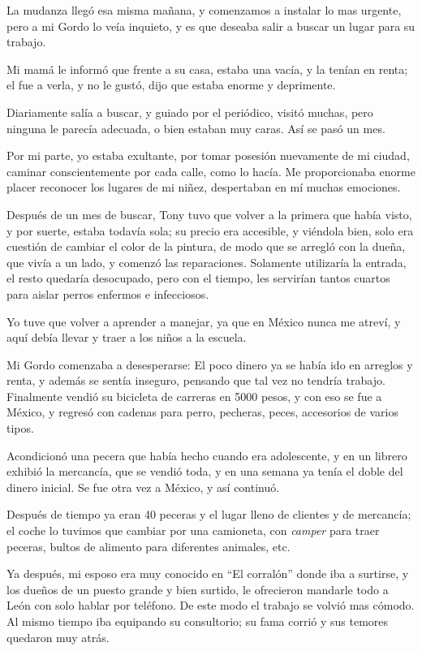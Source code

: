 \documentclass[letterpaper, 12pt]{book}
\begin{document}
La mudanza llegó esa misma mañana, y comenzamos a instalar lo mas urgente, pero a mi Gordo lo veía inquieto, y es que deseaba salir a buscar un lugar para su trabajo. 

Mi mamá le informó que frente a su casa, estaba una vacía, y la tenían en renta; el fue a verla, y no le gustó, dijo que estaba enorme y deprimente.

Diariamente salía a buscar, y guiado por el periódico, visitó muchas, pero ninguna le parecía adecuada, o bien estaban muy caras. Así se pasó un mes.

Por mi parte, yo estaba exultante, por tomar posesión nuevamente de mi ciudad, caminar conscientemente por cada calle, como lo hacía. Me proporcionaba enorme placer reconocer los lugares de mi niñez, despertaban en mí muchas emociones. 

Después de un mes de buscar, Tony tuvo que volver a la primera que había visto, y por suerte, estaba todavía sola; su precio era accesible, y viéndola bien, solo era cuestión de cambiar el color de la pintura, de modo que se arregló con la dueña, que vivía a un lado, y comenzó las reparaciones. Solamente utilizaría la entrada, el resto quedaría desocupado, pero con el tiempo, les servirían tantos cuartos para aislar perros enfermos e infecciosos. 

Yo tuve que volver a aprender a manejar, ya que en México nunca me atreví, y aquí debía llevar y traer a los niños a la escuela.

Mi Gordo comenzaba a desesperarse: El poco dinero ya se había ido en arreglos y renta, y además se sentía inseguro, pensando que tal vez no tendría trabajo. Finalmente vendió su bicicleta de carreras en 5000 pesos, y con eso se fue a México, y regresó con cadenas para perro, pecheras, peces, accesorios de varios tipos.

Acondicionó una pecera que había hecho cuando era adolescente, y en un librero exhibió la mercancía, que se vendió toda, y en una semana ya tenía el doble del dinero inicial. Se fue otra vez a México, y así continuó. 

Después de tiempo ya eran 40 peceras y el lugar lleno de clientes y de mercancía; el coche lo tuvimos que cambiar por una camioneta, con \textit{camper} para traer peceras, bultos de alimento para diferentes animales, etc. 

Ya después, mi esposo era muy conocido en ``El corralón'' donde iba a surtirse, y los dueños de un puesto grande y bien surtido, le ofrecieron mandarle todo a León con solo hablar por teléfono. De este modo el trabajo se volvió mas cómodo. Al mismo tiempo iba equipando su consultorio; su fama corrió y sus temores quedaron muy atrás.
\end{document}
